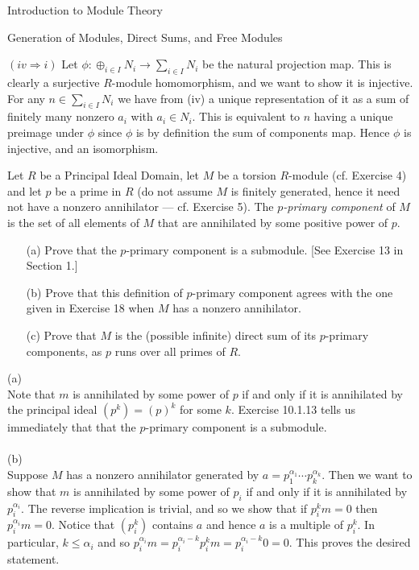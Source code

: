 \begin{chapter}{Introduction to Module Theory}
\begin{section}{Generation of Modules, Direct Sums, and Free Modules}
\begin{solution}
$(iv \Rightarrow i)$ Let $\phi: \oplus_{i\in I} N_i \to \sum_{i\in I} N_i$ be the natural projection map. This is clearly a surjective $R$-module homomorphism, and we want to show it is injective. For any $n\in \sum_{i\in I} N_i$ we have from (iv) a unique representation of it as a sum of finitely many nonzero $a_i$ with $a_i\in N_i$. This is equivalent to $n$ having a unique preimage under $\phi$ since $\phi$ is by definition the sum of components map. Hence $\phi$ is injective, and an isomorphism. 
\end{solution}\oneperpage



\begin{problem}\label{ex:10.3.22}
Let $R$ be a Principal Ideal Domain, let $M$ be a torsion $R$-module (cf. Exercise 4) and let $p$ be a prime in $R$ (do not assume $M$ is finitely generated, hence it need not have a nonzero annihilator --- cf. Exercise 5). The \emph{$p$-primary component} of $M$ is the set of all elements of $M$ that are annihilated by some positive power of $p$.
\begin{enumerate}
\item[(a)] Prove that the $p$-primary component is a submodule. [See Exercise 13 in Section 1.]
\item[(b)] Prove that this definition of $p$-primary component agrees with the one given in Exercise 18 when $M$ has a nonzero annihilator.
\item[(c)] Prove that $M$ is the (possible infinite) direct sum of its $p$-primary components, as $p$ runs over all primes of $R$.
\end{enumerate}
\end{problem}
\begin{solution}
(a)\\
Note that $m$ is annihilated by some power of $p$ if and only if it is annihilated by the principal ideal $(p^k) = (p)^k$ for some $k$. Exercise 10.1.13 tells us immediately that that the $p$-primary component is a submodule. \\\\
(b)\\
Suppose $M$ has a nonzero annihilator generated by $a = p_1^{\alpha_1}\cdots p_k^{\alpha_k}$. Then we want to show that $m$ is annihilated by some power of $p_i$ if and only if it is annihilated by $p_i^{\alpha_i}$. The reverse implication is trivial, and so we show that if $p_i^km = 0$ then $p_i^{\alpha_i}m = 0$. Notice that $(p_i^k)$ contains $a$ and hence $a$ is a multiple of $p_i^k$. In particular, $k\le \alpha_i$ and so $p_i^{\alpha_i}m = p_{i}^{\alpha_i-k}p_i^{k}m = p_i^{\alpha_i-k} 0 = 0$. This proves the desired statement.\\\\

\end{solution}
\end{section}
\end{chapter}
